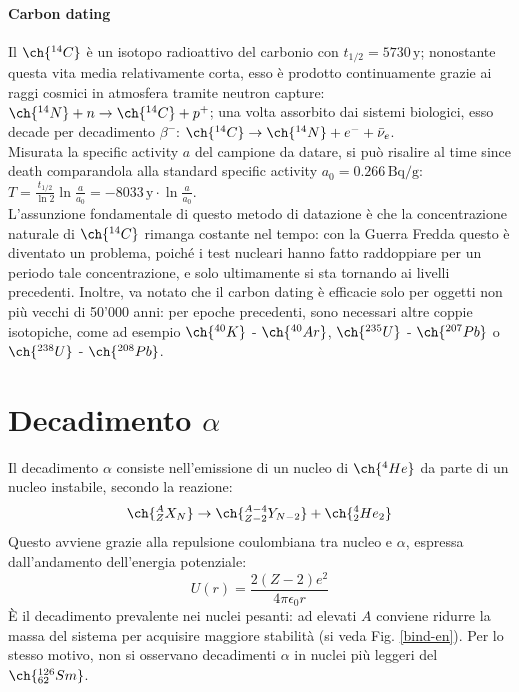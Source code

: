 \paragraph{Carbon dating}

Il $ \ch{^{14}C} $ è un isotopo radioattivo del carbonio con $ t_{1/2} = 5730\,\text{y} $; nonostante questa vita media relativamente corta, esso è prodotto continuamente grazie ai raggi cosmici in atmosfera tramite neutron capture: $ \ch{^{14}N} + n \rightarrow \ch{^{14}C} + p^+ $; una volta assorbito dai sistemi biologici, esso decade per decadimento $ \beta^- $: $ \ch{^{14}C} \rightarrow \ch{^{14}N} + e^- + \bar{\nu}_e $.\\
Misurata la specific activity $ a $ del campione da datare, si può risalire al time since death comparandola alla standard specific activity $ a_0 = 0.266\,\text{Bq}/\text{g} $: $ T = \frac{t_{1/2}}{\ln 2} \ln \frac{a}{a_0} = - 8033\,\text{y} \cdot \ln \frac{a}{a_0} $.\\
L'assunzione fondamentale di questo metodo di datazione è che la concentrazione naturale di $ \ch{^{14}C} $ rimanga costante nel tempo: con la Guerra Fredda questo è diventato un problema, poiché i test nucleari hanno fatto raddoppiare per un periodo tale concentrazione, e solo ultimamente si sta tornando ai livelli precedenti. Inoltre, va notato che il carbon dating è efficacie solo per oggetti non più vecchi di 50'000 anni: per epoche precedenti, sono necessari altre coppie isotopiche, come ad esempio $ \ch{^{40}K} $ - $ \ch{^{40}Ar} $, $ \ch{^{235}U} $ - $ \ch{^{207}Pb} $ o $ \ch{^{238}U} $ - $ \ch{^{208}Pb} $.

\section{Decadimento \texorpdfstring{$ \alpha $}{TEXT}}

Il decadimento $ \alpha $ consiste nell'emissione di un nucleo di $ \ch{^4 He} $ da parte di un nucleo instabile, secondo la reazione:
\begin{equation}
	\ch{^A_Z X_N} \rightarrow \ch{^{A-4}_{Z-2} Y_{N-2}} + \ch{^4_2 He_{2}}
	\label{eq:2.7}
\end{equation}
Questo avviene grazie alla repulsione coulombiana tra nucleo e $ \alpha $, espressa dall'andamento dell'energia potenziale:
\begin{equation}
	U(r) = \frac{2(Z-2)e^2}{4\pi \epsilon_0 r}
	\label{eq:2.8}
\end{equation}
È il decadimento prevalente nei nuclei pesanti: ad elevati $ A $ conviene ridurre la massa del sistema per acquisire maggiore stabilità (si veda Fig. \ref{bind-en}). Per lo stesso motivo, non si osservano decadimenti $ \alpha $ in nuclei più leggeri del $ \ch{^{126}_{62} Sm} $.

